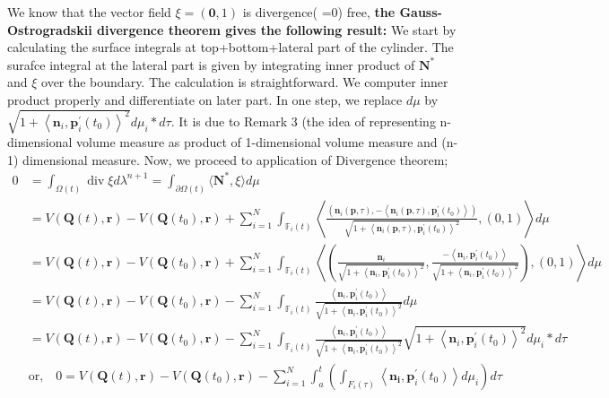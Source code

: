 We know that the vector field $\xi=(\mathbf{0}, 1)$ is divergence( =0) free, \textbf{the Gauss-Ostrogradskii divergence theorem gives the following result:} We start by calculating the surface integrals at top+bottom+lateral part of the cylinder. The surafce integral at the lateral part is given by integrating inner product of $\mathbf{N}^*$ and $\xi$ over the boundary. The calculation is straightforward. We computer inner product properly and differentiate on later part. In one step, we replace $ d \mu  $ by $\sqrt{1+\left\langle\mathbf{n}_{i}, \mathbf{p}_{i}^{\prime}\left(t_{0}\right)\right\rangle^{2} } d \mu_i * d \tau  $. It is due to Remark 3 (the idea of representing n-dimensional volume measure as product of 1-dimensional volume measure and (n-1) dimensional measure. Now, we proceed to application of Divergence theorem;
$$
\begin{aligned}
0 & =\int_{\Omega(t)} \operatorname{div} \xi d \lambda^{n+1}=\int_{\partial \Omega(t)}\langle\mathbf{N}^*, \xi\rangle d \mu \\
& =V(\mathbf{Q}(t), \mathbf{r})-V\left(\mathbf{Q}\left(t_{0}\right), \mathbf{r}\right)+\sum_{i=1}^{N} \int_{\mathbb{F}_{i}(t)}\left\langle \frac{\left(\mathbf{n}_{i}(\mathbf{p}, \tau),-\left\langle\mathbf{n}_{i}(\mathbf{p}, \tau), \mathbf{p}_{i}^{\prime}\left(t_{0}\right)\right\rangle\right)}{\sqrt{1+\left\langle\mathbf{n}_{i}(\mathbf{p}, \tau), \mathbf{p}_{i}^{\prime}\left(t_{0}\right)\right\rangle^{2}}}, (0,1) \right\rangle d \mu \\
& =V(\mathbf{Q}(t), \mathbf{r})-V\left(\mathbf{Q}\left(t_{0}\right), \mathbf{r}\right)+ \sum_{i=1}^N             \int_{\mathbb{F}_i(t)}\left\langle \left( \frac{ \mathbf{n}_{i} } {\sqrt{1+\left\langle \mathbf{n}_{i}, \mathbf{p}_{i}^{\prime}\left(t_{0}\right)\right\rangle^{2}}},\frac{- \left\langle\mathbf{n}_{i}, \mathbf{p}_{i}^{\prime}\left(t_{0}\right)\right\rangle} {\sqrt{1+\left\langle \mathbf{n}_{i},\mathbf{p}_{i}^{\prime}\left(t_{0}\right)\right\rangle^{2}}} \right),(0,1)\right\rangle d \mu \\
& =V(\mathbf{Q}(t), \mathbf{r})-V\left(\mathbf{Q}\left(t_{0}\right), \mathbf{r}\right)-\sum_{i=1}^{N} \int_{\mathbb{F}_{i}(t)} \frac{\left\langle\mathbf{n}_{i}, \mathbf{p}_{i}^{\prime}\left(t_{0}\right)\right\rangle}{\sqrt{1+\left\langle\mathbf{n}_{i}, \mathbf{p}_{i}^{\prime}\left(t_{0}\right)\right\rangle^{2}}} d \mu \\
& =V(\mathbf{Q}(t), \mathbf{r})-V\left(\mathbf{Q}\left(t_{0}\right), \mathbf{r}\right)-\sum_{i=1}^{N} \int_{\mathbb{F}_{i}(t)} \frac{\left\langle\mathbf{n}_{i}, \mathbf{p}_{i}^{\prime}\left(t_{0}\right)\right\rangle}{\sqrt{1+\left\langle\mathbf{n}_{i}, \mathbf{p}_{i}^{\prime}\left(t_{0}\right)\right\rangle^{2}}}  \sqrt{1+\left\langle\mathbf{n}_{i}, \mathbf{p}_{i}^{\prime}\left(t_{0}\right)\right\rangle^{2} } d \mu_i * d \tau \\
& \text{or,}\quad 0 =V(\mathbf{Q}(t), \mathbf{r})-V\left(\mathbf{Q}\left(t_{0}\right), \mathbf{r}\right)-\sum_{i=1}^{N} \int_{a}^{t}\left(\int_{F_{i}(\tau)}\left\langle\mathbf{n}_{\mathbf{i}}, \mathbf{p}_{i}^{\prime}\left(t_{0}\right)\right\rangle d \mu_{i}\right) d \tau
\end{aligned}
$$
